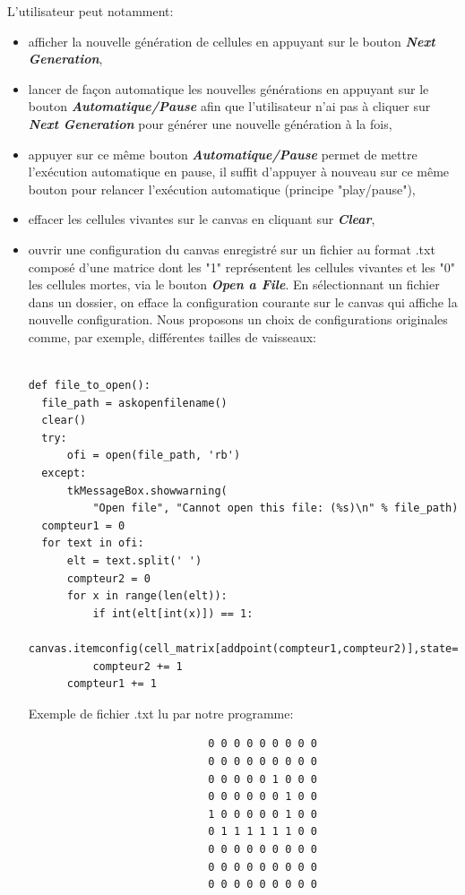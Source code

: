 \documentclass{article}
\begin{document}
L'utilisateur peut notamment:
\begin{itemize}

\item afficher la nouvelle génération de cellules en appuyant sur le bouton \textbf{\textit{Next Generation}},

\item lancer de façon automatique les nouvelles générations en appuyant sur le bouton  \textbf{\textit{Automatique/Pause}} afin que l'utilisateur n'ai pas à cliquer sur \textbf{\textit{Next Generation}} pour générer une nouvelle génération à la fois,

\item appuyer sur ce même bouton \textbf{\textit{Automatique/Pause}} permet de mettre l’exécution automatique en pause, il suffit d’appuyer à nouveau sur ce même bouton pour relancer l’exécution automatique (principe "play/pause"),

\item effacer les cellules vivantes sur le canvas en cliquant sur \textbf{\textit{Clear}},

\item ouvrir une configuration du canvas enregistré sur un fichier au format .txt composé d'une matrice dont les "1" représentent les cellules vivantes et les "0" les cellules mortes, via le bouton \textbf{\textit{Open a File}}. En sélectionnant un fichier dans un dossier, on efface la configuration courante sur le canvas qui affiche la nouvelle configuration. Nous proposons un choix de configurations originales comme, par exemple, différentes tailles de vaisseaux:

\begin{verbatim}

def file_to_open():
  file_path = askopenfilename()
  clear()
  try:
      ofi = open(file_path, 'rb')
  except:
      tkMessageBox.showwarning(
          "Open file", "Cannot open this file: (%s)\n" % file_path)
  compteur1 = 0
  for text in ofi:
      elt = text.split(' ')
      compteur2 = 0
      for x in range(len(elt)):
          if int(elt[int(x)]) == 1:
              canvas.itemconfig(cell_matrix[addpoint(compteur1,compteur2)],state=NORMAL,tags='vis')
          compteur2 += 1
      compteur1 += 1
\end{verbatim}

Exemple de fichier .txt lu par notre programme:
\begin{verbatim}
							0 0 0 0 0 0 0 0 0
							0 0 0 0 0 0 0 0 0
							0 0 0 0 0 1 0 0 0
							0 0 0 0 0 0 1 0 0
							1 0 0 0 0 0 1 0 0
							0 1 1 1 1 1 1 0 0
							0 0 0 0 0 0 0 0 0
							0 0 0 0 0 0 0 0 0
							0 0 0 0 0 0 0 0 0
\end{verbatim}


\end{itemize}
\end{document}
